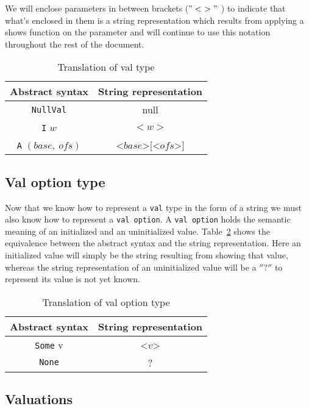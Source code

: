 We will enclose parameters in between brackets ($"<\ >"$ ) to indicate that what's enclosed in them is a string representation which results from applying a shows function on the parameter and will continue to use this notation throughout the rest of the document.

\begin{table}[h!]
\centering
\begin{tabular}{|c|c|}
  \hline
  \textbf{Abstract syntax} & \textbf{String representation} \\ [0.5ex]
  \hline \hline
  \verb|NullVal| & null \\
  \verb|I| $w$ & $<w>$ \\
  \verb|A| $(base,\ ofs)$ & <$base$>[<$ofs$>] \\
  \hline
\end{tabular}

\caption{Translation of val type}
\label{tab:pretty_val}
\end{table}

\subsection{Val option type}\label{subsection:pretty_val_option_type}

Now that we know how to represent a \verb|val| type in the form of a string we must also know how to represent a \verb|val option|.
A \verb|val option| holds the semantic meaning of an initialized and an uninitialized value.
Table~\ref{tab:pretty_val_option} shows the equivalence between the abstract syntax and the string representation.
Here an initialized value will simply be the string resulting from showing that value, whereas the string representation of an uninitialized value will be a $''?''$ to represent its value is not yet known.

\begin{table}[h!]
\centering
\begin{tabular}{|c|c|}
  \hline
  \textbf{Abstract syntax} & \textbf{String representation} \\ [0.5ex]
  \hline \hline
  \verb|Some| v & <$v$> \\
  \verb|None| & ? \\
  \hline
\end{tabular}

\caption{Translation of val option type}
\label{tab:pretty_val_option}
\end{table}


\subsection{Valuations}\label{subsection:pretty_valuations}

